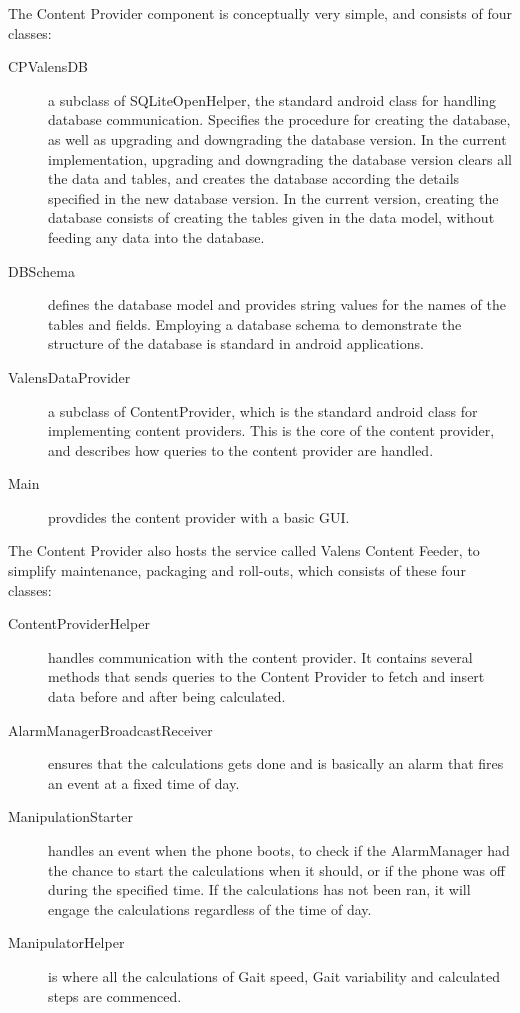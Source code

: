 The Content Provider component is conceptually very simple, and consists of four classes:
\begin{description}
\item[CPValensDB]
a subclass of SQLiteOpenHelper, the standard android class for handling database communication. Specifies the procedure for creating the database, as well as upgrading and downgrading the database version. In the current implementation, upgrading and downgrading the database version clears all the data and tables, and creates the database according the details specified in the new database version. In the current version, creating the database consists of creating the tables given in the data model, without feeding any data into the database.
\item[DBSchema]
defines the database model and provides string values for the names of the tables and fields. Employing a database schema to demonstrate the structure of the database is standard in android applications.
\item[ValensDataProvider]
a subclass of ContentProvider, which is the standard android class for implementing content providers. This is the core of the content provider, and describes how queries to the content provider are handled.
\item[Main]
provdides the content provider with a basic GUI.
\end{description}
\label{def:contentfeeder}
The Content Provider also hosts the service called Valens Content Feeder, to simplify maintenance, packaging and roll-outs, which consists of these four classes:
\begin{description}
\item[ContentProviderHelper] handles communication with the content provider. It contains several methods that sends queries to the Content Provider to fetch and insert data before and after being calculated.
\item[AlarmManagerBroadcastReceiver] ensures that the calculations gets done and is basically an alarm that fires an event at a fixed time of day.
\item[ManipulationStarter] handles an event when the phone boots, to check if the AlarmManager had the chance to start the calculations when it should, or if the phone was off during the specified time. If the calculations has not been ran, it will engage the calculations regardless of the time of day.
\item[ManipulatorHelper] is where all the calculations of Gait speed, Gait variability and calculated steps are commenced.
\end{description}

